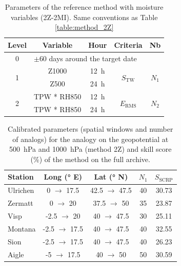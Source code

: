 \documentclass[hess, manuscript]{copernicus}
\begin{document}
\begin{table}[htb]
	\caption{Parameters of the reference method with moisture variables (2Z-2MI). Same conventions as Table \ref{table:method_2Z}}
	\footnotesize
	\begin{center}
		\begin{tabular}{ccccc}
			\hline 
			Level & Variable & Hour & Criteria & Nb \\ 
			\hline 
			0 & \multicolumn{4}{l}{$\pm 60$ days around the target date} \\
			\hline 
			\multirow{2}{*}{1} & Z1000 & 12~h & \multirow{2}{*}{$S_{\text{TW}}$} & \multirow{2}{*}{$N_{1}$} \\
			& Z500 & 24~h & & \\ 
			\hline
			\multirow{2}{*}{2} & TPW * RH850 & 12~h & \multirow{2}{*}{$E_{\text{RMS}}$} & \multirow{2}{*}{$N_{2}$} \\
			& TPW * RH850 & 24~h & & \\ 
			\hline 
		\end{tabular} 
	\end{center}
	\label{table:method_2Z-2MI}
\end{table}

\begin{table}[htb]
	\caption{Calibrated parameters (spatial windows and number of analogs) for the analogy on the geopotential at 500~hPa and 1000~hPa (method 2Z) and skill score (\%) of the method on the full archive.}
	\begin{center}
		\begin{tabular}{l c c c c }
			\hline
			Station & Long (° E) & Lat (° N) & $N_{1}$ & $S_{\text{SCRP}}$ \\
			\hline
			Ulrichen & 0 $\rightarrow$ 17.5 & 42.5 $\rightarrow$ 47.5 & 40 & 30.73 \\
			Zermatt & 0 $\rightarrow$ 20 & 37.5 $\rightarrow$ 50 & 35 & 23.87 \\
			Visp & -2.5 $\rightarrow$ 20 & 40 $\rightarrow$ 47.5 & 30 & 25.11 \\
			Montana & -2.5 $\rightarrow$ 17.5 & 40 $\rightarrow$ 47.5 & 40 & 32.55 \\
			Sion & -2.5 $\rightarrow$ 17.5 & 40 $\rightarrow$ 47.5 & 40 & 26.23 \\
			Aigle & -5 $\rightarrow$ 17.5 & 40 $\rightarrow$ 50 & 50 & 30.59 \\ 
			\hline
		\end{tabular}
	\end{center}
	\label{table:params_2Z}
\end{table}
\end{document}
